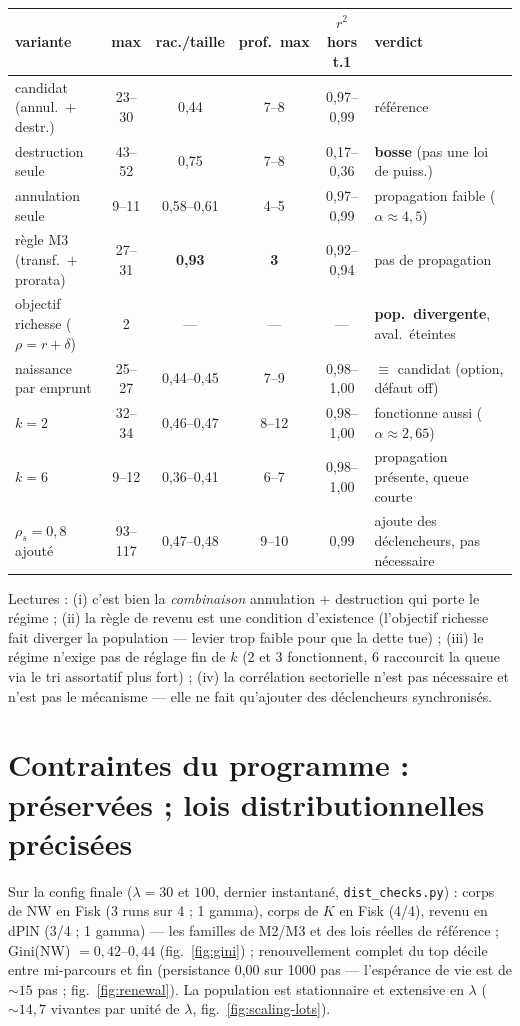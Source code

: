 \documentclass[11pt,a4paper]{article}
\newcommand{\NW}{\mathrm{NW}}
\newcommand{\code}[1]{\texttt{#1}}
\begin{document}
\begin{center}
\small
\begin{tabular}{lccccl}
\toprule
variante & max & rac./taille & prof.\ max & $r^2$ hors t.1 & verdict\\
\midrule
candidat (annul.\ $+$ destr.) & 23--30 & 0{,}44 & 7--8 & 0{,}97--0{,}99 & référence\\
destruction seule & 43--52 & 0{,}75 & 7--8 & 0{,}17--0{,}36 & \textbf{bosse} (pas une loi de puiss.)\\
annulation seule & 9--11 & 0{,}58--0{,}61 & 4--5 & 0{,}97--0{,}99 & propagation faible ($\alpha \approx 4{,}5$)\\
règle M3 (transf.\ $+$ prorata) & 27--31 & \textbf{0{,}93} & \textbf{3} & 0{,}92--0{,}94 & pas de propagation\\
objectif richesse ($\rho = r{+}\delta$) & 2 & --- & --- & --- & \textbf{pop.\ divergente}, aval.\ éteintes\\
naissance par emprunt & 25--27 & 0{,}44--0{,}45 & 7--9 & 0{,}98--1{,}00 & $\equiv$ candidat (option, défaut off)\\
$k = 2$ & 32--34 & 0{,}46--0{,}47 & 8--12 & 0{,}98--1{,}00 & fonctionne aussi ($\alpha \approx 2{,}65$)\\
$k = 6$ & 9--12 & 0{,}36--0{,}41 & 6--7 & 0{,}98--1{,}00 & propagation présente, queue courte\\
$\rho_s = 0{,}8$ ajouté & 93--117 & 0{,}47--0{,}48 & 9--10 & 0{,}99 & ajoute des déclencheurs, pas nécessaire\\
\bottomrule
\end{tabular}
\end{center}

Lectures : (i) c'est bien la \emph{combinaison} annulation $+$ destruction
qui porte le régime ; (ii) la règle de revenu est une condition d'existence
(l'objectif richesse fait diverger la population --- levier trop faible pour
que la dette tue) ; (iii) le régime n'exige pas de réglage fin de $k$
(2 et 3 fonctionnent, 6 raccourcit la queue via le tri assortatif plus
fort) ; (iv) la corrélation sectorielle n'est pas nécessaire et n'est pas le
mécanisme --- elle ne fait qu'ajouter des déclencheurs synchronisés.

\section{Contraintes du programme : préservées ; lois distributionnelles précisées}
\label{sec:distributions}

Sur la config finale ($\lambda = 30$ et $100$, dernier instantané,
\code{dist\_checks.py}) : corps de $\NW$ en Fisk (3 runs sur 4 ; 1 gamma),
corps de $K$ en Fisk (4/4), revenu en dPlN (3/4 ; 1 gamma) --- les familles
de M2/M3 et des lois réelles de référence ; Gini($\NW$) $= 0{,}42$--$0{,}44$
(fig.~\ref{fig:gini}) ;
renouvellement complet du top décile entre mi-parcours et fin (persistance
0,00 sur 1000 pas — l'espérance de vie est de ${\sim}15$ pas ;
fig.~\ref{fig:renewal}). La
population est stationnaire et extensive en $\lambda$ (${\sim}14{,}7$
vivantes par unité de $\lambda$, fig.~\ref{fig:scaling-lots}).
\end{document}
